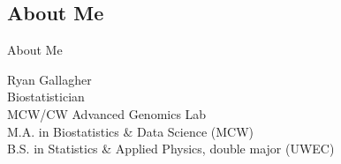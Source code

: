 \documentclass[aspectratio=169,xcolor=dvipsnames]{beamer}
\begin{document}
\subsection{About Me}
\begin{frame}{About Me}



    \begin{center}
        Ryan Gallagher \\
        \vspace{0.5cm}
        Biostatistician\\
        MCW/CW Advanced Genomics Lab \\
        \vspace{0.5cm}
        M.A. in Biostatistics \& Data Science (MCW) \\
        B.S. in Statistics \& Applied Physics, double major (UWEC)
    \end{center}
\end{frame}
\end{document}
